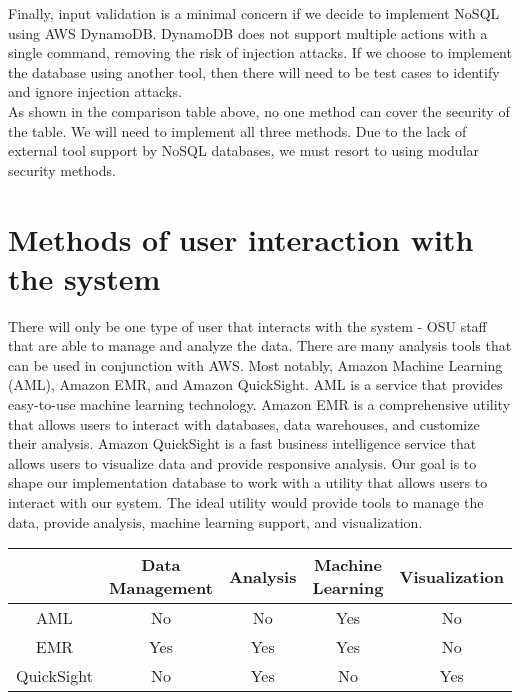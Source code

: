 \documentclass[10pt,draftclsnofoot,onecolumn,journal,compsoc]{IEEEtran}
\begin{document}
        \noindent Finally, input validation is a minimal concern if we decide to implement NoSQL using AWS DynamoDB. DynamoDB does not support multiple actions with a single command, removing the risk of injection attacks. If we choose to implement the database using another tool, then there will need to be test cases to identify and ignore injection attacks.\\
        
        \noindent As shown in the comparison table above, no one method can cover the security of the table. We will need to implement all three methods. Due to the lack of external tool support by NoSQL databases, we must resort to using modular security methods. 
        \section{Methods of user interaction with the system}
        There will only be one type of user that interacts with the system - OSU staff that are able to manage and analyze the data. There are many analysis tools that can be used in conjunction with AWS. Most notably, Amazon Machine Learning (AML), Amazon EMR, and Amazon QuickSight. AML is a service that provides easy-to-use machine learning technology. Amazon EMR is a comprehensive utility that allows users to interact with databases, data warehouses, and customize their analysis. Amazon QuickSight is a fast business intelligence service that allows users to visualize data and provide responsive analysis. Our goal is to shape our implementation database to work with a utility that allows users to interact with our system. The ideal utility would provide tools to manage the data, provide analysis, machine learning support, and visualization.

        \begin{table}[ht]
        \centering
        \begin{tabular}{|c|c|c|c|c|}
            \hline
            \textbf{} & \textbf{Data Management} & \textbf{Analysis} & \textbf{Machine Learning} & \textbf{Visualization}\\
            \hline
            AML & No & No & Yes & No\\
            \hline
            EMR & Yes & Yes & Yes & No\\
            \hline
            QuickSight & No & Yes & No & Yes\\
            \hline
        \end{tabular}
        \end{table}
\end{document}
